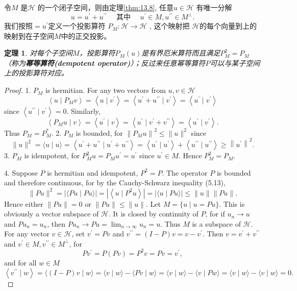\documentclass[hyperref,UTF8]{ctexbook}
\newtheorem{theorem}{定理}[chapter]
\begin{document}
令$M$ 是$\mathcal{H}$ 的一个闭子空间，则由定理\ref{thm:13.8}, 任意$u \in \mathcal{H}$ 有唯一分解
$$
u=u^{\prime}+u^{\prime \prime} \quad \text { 其中 } \quad u^{\prime} \in M, u^{\prime \prime} \in M^{\perp} .
$$
我们按照$=u^{\prime}$定义一个投影算符 $P_{M}: \mathcal{H} \rightarrow \mathcal{H}$ , 这个映射把 $\mathcal{H}$的每个向量到上的映射到在子空间$M$中的正交投影。
\begin{theorem}
    对每个子空间\(M\)，投影算符\(P_{M}(u)\)是有界厄米算符而且满足\(P^2_{M}=P_{M}\)（称为\textbf{幂等算符(dempotent operator)}）；反过来任意幂等算符\(P\)可以与某子空间上的投影算符对应。
\end{theorem}
\begin{proof}
     1. $P_{M}$ is hermitian. For any two vectors from $u, v \in \mathcal{H}$
$$
\left\langle u \mid P_{M} v\right\rangle=\left\langle u \mid v^{\prime}\right\rangle=\left\langle u^{\prime}+u^{\prime \prime} \mid v^{\prime}\right\rangle=\left\langle u^{\prime} \mid v^{\prime}\right\rangle
$$
since $\left\langle u^{\prime \prime} \mid v^{\prime}\right\rangle=0$. Similarly,
$$
\left\langle P_{M} u \mid v\right\rangle=\left\langle u^{\prime} \mid v\right\rangle=\left\langle u^{\prime} \mid v^{\prime}+v^{\prime \prime}\right\rangle=\left\langle u^{\prime} \mid v^{\prime}\right\rangle .
$$
Thus $P_{M}=P_{M}^{*}$.
2. $P_{M}$ is bounded, for $\left\|P_{M} u\right\|^{2} \leq\|u\|^{2}$ since
$$
\|u\|^{2}=\langle u \mid u\rangle=\left\langle u^{\prime}+u^{\prime \prime} \mid u^{\prime}+u^{\prime \prime}\right\rangle=\left\langle u^{\prime} \mid u^{\prime}\right\rangle+\left\langle u^{\prime \prime} \mid u^{\prime \prime}\right\rangle \geq\left\|u^{\prime}\right\|^{2} .
$$
3. $P_{M}$ is idempotent, for $P_{M}^{2} u=P_{M} u^{\prime}=u^{\prime}$ since $u^{\prime} \in M$. Hence $P_{M}^{2}=P_{M}$.

4. Suppose $P$ is hermitian and idempotent, $P^{2}=P$. The operator $P$ is bounded and therefore continuous, for by the Cauchy-Schwarz inequality (5.13),
$$
\|P u\|^{2}=|\langle P u \mid P u\rangle|=\left|\left\langle u \mid P^{2} u\right\rangle\right|=|\langle u \mid P u\rangle| \leq\|u\|\|P u\| .
$$
Hence either $\|P u\|=0$ or $\|P u\| \leq\|u\|$.
Let $M=\{u \mid u=P u\}$. This is obviously a vector subspace of $\mathcal{H}$. It is closed by continuity of $P$, for if $u_{n} \rightarrow u$ and $P u_{n}=u_{n}$, then $P u_{n} \rightarrow P u=\lim _{n \rightarrow \infty} u_{n}=u$. Thus $M$ is a subspace of $\mathcal{H}$. For any vector $v \in \mathcal{H}$, set $v^{\prime}=P v$ and $v^{\prime \prime}=(I-P) v=v-v^{\prime}$. Then $v=v^{\prime}+v^{\prime \prime}$ and $v^{\prime} \in M, v^{\prime \prime} \in M^{\perp}$, for
$$
P v^{\prime}=P(P v)=P^{2} v=P v=v^{\prime},
$$
and for all $w \in M$
$$
\left\langle v^{\prime \prime} \mid w\right\rangle=\langle(I-P) v \mid w\rangle=\langle v \mid w\rangle-\langle P v \mid w\rangle=\langle v \mid w\rangle-\langle v \mid P w\rangle=\langle v \mid w\rangle-\langle v \mid w\rangle=0 .
$$
\end{proof}
\end{document}
